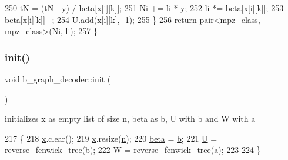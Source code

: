 \begin{DoxyCode}
250     tN = (tN - y) / \hyperlink{classb__graph__decoder_a3e5babfb07af486c1d9e991f65251266}{beta}[\hyperlink{classb__graph__decoder_a6bba2e67984f9733fc60c40dd4956587}{x}[i][k]];
251     Ni += li * y;
252     li *= \hyperlink{classb__graph__decoder_a3e5babfb07af486c1d9e991f65251266}{beta}[\hyperlink{classb__graph__decoder_a6bba2e67984f9733fc60c40dd4956587}{x}[i][k]];
253     \hyperlink{classb__graph__decoder_a3e5babfb07af486c1d9e991f65251266}{beta}[x[i][k]] --;
254     \hyperlink{classb__graph__decoder_ae15e74088bb60a096562a9bdaf380f2c}{U}.\hyperlink{classreverse__fenwick__tree_a942d7f49b37e53ebfec3076d177691d7}{add}(x[i][k], -1);
255   \}
256   \textcolor{keywordflow}{return} pair<mpz\_class, mpz\_class>(Ni, li);
257 \}
\end{DoxyCode}
\mbox{\label{classb__graph__decoder_a9498e8aa7391480cc663bffef3718c6b}} 
\subsubsection{\texorpdfstring{init()}{init()}}
{\footnotesize\ttfamily void b\+\_\+graph\+\_\+decoder\+::init (\begin{DoxyParamCaption}{ }\end{DoxyParamCaption})}



initializes x as empty list of size n, beta as b, U with b and W with a 


\begin{DoxyCode}
217 \{
218   \hyperlink{classb__graph__decoder_a6bba2e67984f9733fc60c40dd4956587}{x}.clear();
219   \hyperlink{classb__graph__decoder_a6bba2e67984f9733fc60c40dd4956587}{x}.resize(\hyperlink{classb__graph__decoder_a2caddd63df6808c95e2ee738f7c77870}{n});
220   \hyperlink{classb__graph__decoder_a3e5babfb07af486c1d9e991f65251266}{beta} = \hyperlink{classb__graph__decoder_a12d1a4a91f342111d2116196cb826317}{b};
221   \hyperlink{classb__graph__decoder_ae15e74088bb60a096562a9bdaf380f2c}{U} = \hyperlink{classreverse__fenwick__tree}{reverse\_fenwick\_tree}(\hyperlink{classb__graph__decoder_a12d1a4a91f342111d2116196cb826317}{b});
222   \hyperlink{classb__graph__decoder_a2c3f91db1f54ddfd411f74d18b01b606}{W} = \hyperlink{classreverse__fenwick__tree}{reverse\_fenwick\_tree}(\hyperlink{classb__graph__decoder_afcf783e4199fb8f9d6828db08bb12333}{a});
223   
224 \}
\end{DoxyCode}


